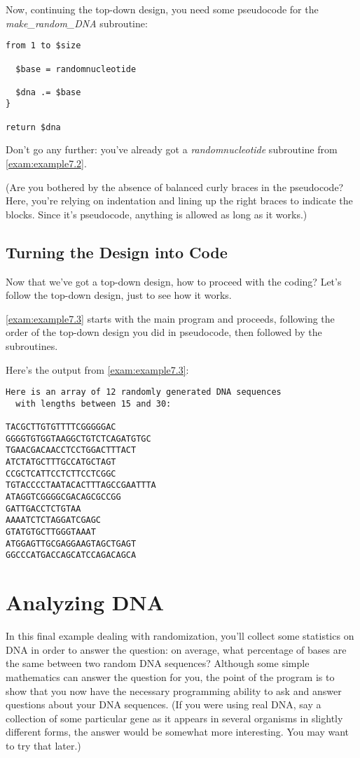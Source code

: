 Now, continuing the top-down design, you need some pseudocode for the \textit{make\_random\_DNA} subroutine:

\begin{lstlisting}
from 1 to $size

  $base = randomnucleotide

  $dna .= $base
}

return $dna
\end{lstlisting}

Don't go any further: you've already got a \textit{randomnucleotide} subroutine from \autoref{exam:example7.2}.

(Are you bothered by the absence of balanced curly braces in the pseudocode? Here, you're relying on indentation and lining up the right braces to indicate the blocks. Since it's pseudocode, anything is allowed as long as it works.) 

\subsection{Turning the Design into Code}
Now that we've got a top-down design, how to proceed with the coding? Let's follow the top-down design, just to see how it works.

\autoref{exam:example7.3} starts with the main program and proceeds, following the order of the top-down design you did in pseudocode, then followed by the subroutines. 



Here's the output from \autoref{exam:example7.3}:

\begin{lstlisting}
Here is an array of 12 randomly generated DNA sequences
  with lengths between 15 and 30:

TACGCTTGTGTTTTCGGGGGAC
GGGGTGTGGTAAGGCTGTCTCAGATGTGC
TGAACGACAACCTCCTGGACTTTACT
ATCTATGCTTTGCCATGCTAGT
CCGCTCATTCCTCTTCCTCGGC
TGTACCCCTAATACACTTTAGCCGAATTTA
ATAGGTCGGGGCGACAGCGCCGG
GATTGACCTCTGTAA
AAAATCTCTAGGATCGAGC
GTATGTGCTTGGGTAAAT
ATGGAGTTGCGAGGAAGTAGCTGAGT
GGCCCATGACCAGCATCCAGACAGCA
\end{lstlisting}

\section{Analyzing DNA}
In this final example dealing with randomization, you'll collect some statistics on DNA in order to answer the question: on average, what percentage of bases are the same between two random DNA sequences? Although some simple mathematics can answer the question for you, the point of the program is to show that you now have the necessary programming ability to ask and answer questions about your DNA sequences. (If you were using real DNA, say a collection of some particular gene as it appears in several organisms in slightly different forms, the answer would be somewhat more interesting. You may want to try that later.)

